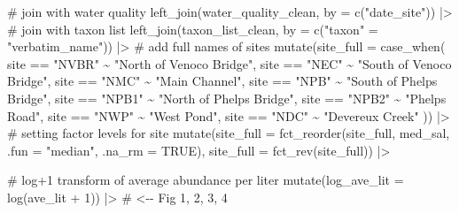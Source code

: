 \documentclass[
  letterpaper,
  DIV=11,
  numbers=noendperiod]{scrartcl}
\newenvironment{Shaded}{\begin{snugshade}}{\end{snugshade}}
\newcommand{\AttributeTok}[1]{\textcolor[rgb]{0.40,0.45,0.13}{#1}}
\newcommand{\CommentTok}[1]{\textcolor[rgb]{0.37,0.37,0.37}{#1}}
\newcommand{\ConstantTok}[1]{\textcolor[rgb]{0.56,0.35,0.01}{#1}}
\newcommand{\DecValTok}[1]{\textcolor[rgb]{0.68,0.00,0.00}{#1}}
\newcommand{\FunctionTok}[1]{\textcolor[rgb]{0.28,0.35,0.67}{#1}}
\newcommand{\NormalTok}[1]{\textcolor[rgb]{0.00,0.23,0.31}{#1}}
\newcommand{\OtherTok}[1]{\textcolor[rgb]{0.00,0.23,0.31}{#1}}
\newcommand{\SpecialCharTok}[1]{\textcolor[rgb]{0.37,0.37,0.37}{#1}}
\newcommand{\StringTok}[1]{\textcolor[rgb]{0.13,0.47,0.30}{#1}}
\begin{document}
\begin{Shaded}
\begin{Highlighting}[]
  \CommentTok{\# join with water quality}
  \FunctionTok{left\_join}\NormalTok{(water\_quality\_clean, }\AttributeTok{by =} \FunctionTok{c}\NormalTok{(}\StringTok{"date\_site"}\NormalTok{)) }\SpecialCharTok{|\textgreater{}} 
  \CommentTok{\# join with taxon list}
  \FunctionTok{left\_join}\NormalTok{(taxon\_list\_clean, }\AttributeTok{by =} \FunctionTok{c}\NormalTok{(}\StringTok{"taxon"} \OtherTok{=} \StringTok{"verbatim\_name"}\NormalTok{)) }\SpecialCharTok{|\textgreater{}} 
  \CommentTok{\# add full names of sites}
  \FunctionTok{mutate}\NormalTok{(}\AttributeTok{site\_full =} \FunctionTok{case\_when}\NormalTok{(}
\NormalTok{    site }\SpecialCharTok{==} \StringTok{"NVBR"} \SpecialCharTok{\textasciitilde{}} \StringTok{"North of Venoco Bridge"}\NormalTok{,}
\NormalTok{    site }\SpecialCharTok{==} \StringTok{"NEC"} \SpecialCharTok{\textasciitilde{}} \StringTok{"South of Venoco Bridge"}\NormalTok{,}
\NormalTok{    site }\SpecialCharTok{==} \StringTok{"NMC"} \SpecialCharTok{\textasciitilde{}} \StringTok{"Main Channel"}\NormalTok{,}
\NormalTok{    site }\SpecialCharTok{==} \StringTok{"NPB"} \SpecialCharTok{\textasciitilde{}} \StringTok{"South of Phelps Bridge"}\NormalTok{,}
\NormalTok{    site }\SpecialCharTok{==} \StringTok{"NPB1"} \SpecialCharTok{\textasciitilde{}} \StringTok{"North of Phelps Bridge"}\NormalTok{,}
\NormalTok{    site }\SpecialCharTok{==} \StringTok{"NPB2"} \SpecialCharTok{\textasciitilde{}} \StringTok{"Phelps Road"}\NormalTok{,}
\NormalTok{    site }\SpecialCharTok{==} \StringTok{"NWP"} \SpecialCharTok{\textasciitilde{}}  \StringTok{"West Pond"}\NormalTok{,}
\NormalTok{    site }\SpecialCharTok{==} \StringTok{"NDC"} \SpecialCharTok{\textasciitilde{}} \StringTok{"Devereux Creek"}
\NormalTok{  )) }\SpecialCharTok{|\textgreater{}} 
  \CommentTok{\# setting factor levels for site}
  \FunctionTok{mutate}\NormalTok{(}\AttributeTok{site\_full =} \FunctionTok{fct\_reorder}\NormalTok{(site\_full, med\_sal, }\AttributeTok{.fun =} \StringTok{"median"}\NormalTok{, }\AttributeTok{.na\_rm =} \ConstantTok{TRUE}\NormalTok{),}
         \AttributeTok{site\_full =} \FunctionTok{fct\_rev}\NormalTok{(site\_full)) }\SpecialCharTok{|\textgreater{}} 
  
  \CommentTok{\# log+1 transform of average abundance per liter}
  \FunctionTok{mutate}\NormalTok{(}\AttributeTok{log\_ave\_lit =} \FunctionTok{log}\NormalTok{(ave\_lit }\SpecialCharTok{+} \DecValTok{1}\NormalTok{)) }\SpecialCharTok{|\textgreater{}}                        \CommentTok{\# \textless{}{-}{-} Fig 1, 2, 3, 4}
  

\end{Highlighting}
\end{Shaded}
\end{document}
